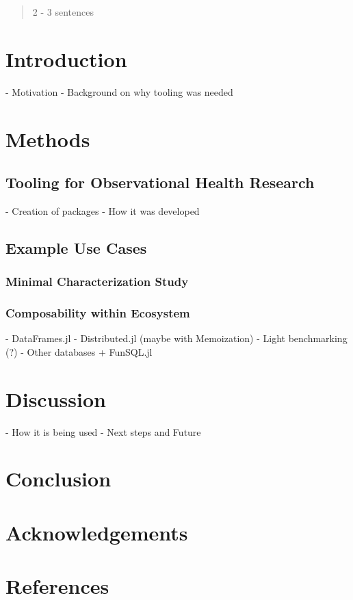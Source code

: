 \documentclass{juliacon}
\begin{document}


\maketitle

\begin{abstract}

	2 - 3 sentences

\end{abstract}

\section{Introduction}

- Motivation
- Background on why tooling was needed

\section{Methods}

\subsection{Tooling for Observational Health Research}
- Creation of packages 
- How it was developed

\subsection{Example Use Cases}

\subsubsection{Minimal Characterization Study}

\subsubsection{Composability within Ecosystem} 

- DataFrames.jl
- Distributed.jl (maybe with Memoization)
- Light benchmarking (?)
- Other databases + FunSQL.jl

\section{Discussion}

- How it is being used 
- Next steps and Future

\section{Conclusion}

\section{Acknowledgements}

\section{References}


\end{document}
